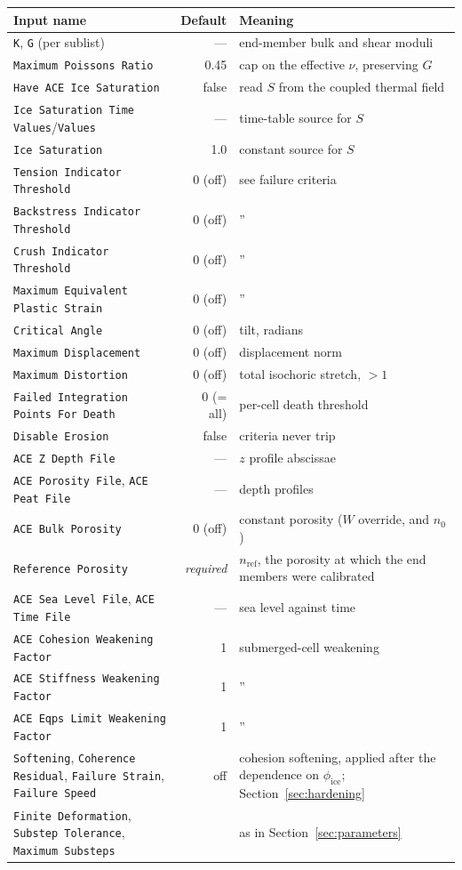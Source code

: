 \documentclass[12pt]{article}
\begin{document}
\begin{center}
\small
\begin{tabular}{lrp{6.6cm}}
\toprule
Input name & Default & Meaning \\
\midrule
\texttt{K}, \texttt{G} (per sublist) & --- &
  end-member bulk and shear moduli \\
\texttt{Maximum Poissons Ratio} & 0.45 &
  cap on the effective $\nu$, preserving $G$ \\
\midrule
\texttt{Have ACE Ice Saturation} & false &
  read $S$ from the coupled thermal field \\
\texttt{Ice Saturation Time Values}/\texttt{Values} & --- &
  time-table source for $S$ \\
\texttt{Ice Saturation} & 1.0 & constant source for $S$ \\
\midrule
\texttt{Tension Indicator Threshold}    & 0 (off) & see failure criteria \\
\texttt{Backstress Indicator Threshold} & 0 (off) & '' \\
\texttt{Crush Indicator Threshold}      & 0 (off) & '' \\
\texttt{Maximum Equivalent Plastic Strain} & 0 (off) & '' \\
\texttt{Critical Angle}                 & 0 (off) & tilt, radians \\
\texttt{Maximum Displacement}           & 0 (off) & displacement norm \\
\texttt{Maximum Distortion}             & 0 (off) &
  total isochoric stretch, $> 1$ \\
\texttt{Failed Integration Points For Death} & 0 (= all) &
  per-cell death threshold \\
\texttt{Disable Erosion} & false & criteria never trip \\
\midrule
\texttt{ACE Z Depth File} & --- & $z$ profile abscissae \\
\texttt{ACE Porosity File}, \texttt{ACE Peat File} & --- &
  depth profiles \\
\texttt{ACE Bulk Porosity} & 0 (off) & constant porosity
  ($W$ override, and $n_0$) \\
\texttt{Reference Porosity} & \emph{required} &
  $n_{\mathrm{ref}}$, the porosity at which the end members were
  calibrated \\
\texttt{ACE Sea Level File}, \texttt{ACE Time File} & --- &
  sea level against time \\
\texttt{ACE Cohesion Weakening Factor}   & 1 & submerged-cell weakening \\
\texttt{ACE Stiffness Weakening Factor}  & 1 & '' \\
\texttt{ACE Eqps Limit Weakening Factor} & 1 & '' \\
\midrule
\texttt{Softening}, \texttt{Coherence Residual}, \texttt{Failure Strain},
\texttt{Failure Speed} & off &
  cohesion softening, applied after the dependence on
  $\phi_{\mathrm{ice}}$;
  Section~\ref{sec:hardening} \\
\midrule
\texttt{Finite Deformation}, \texttt{Substep Tolerance},
\texttt{Maximum Substeps} & &
  as in Section~\ref{sec:parameters} \\
\bottomrule
\end{tabular}
\end{center}
\end{document}
